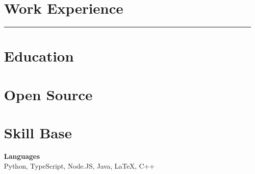 \documentclass{article}
\newcommand{\ruleLine}{
   	\begin{center}
  	\color{lines}
 	\rule{0.5\textwidth}{.4pt}
	\end{center}
}
\begin{document}
\begin{minipage}[t]{0.55\textwidth}

\raggedright

  \section{Work Experience}
  
  	

  	\ruleLine

  	
  	
\end{minipage}
\hfill
\begin{minipage}[t]{0.43\textwidth}

\raggedright

	\section{Education}

   	

  	\vspace{8pt}

  	  	

\vspace{10pt}

	\section{Open Source}

	

  	\vspace{8pt}

	

  	\vspace{8pt}

  	

\vspace{10pt}

	\section{Skill Base}
  	\textbf{Languages} \\
  	{\small
  		{\color{highlight}
			Python, TypeScript, Node.JS,
      }
		Java, LaTeX, C++
 	}


\end{minipage}
\end{document}
